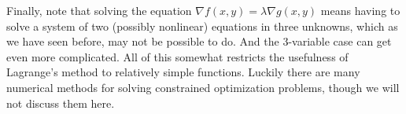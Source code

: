 Finally, note that solving the equation $\nabla f(x,y) = \lambda \nabla g(x,y)$ means having to solve a system of two (possibly nonlinear) equations in three unknowns, which as we have seen before, may not be possible to do. And the 3-variable case can get even more complicated. All of this somewhat restricts the usefulness of Lagrange's method to relatively simple functions. Luckily there are many numerical methods for solving constrained optimization problems, though we will not discuss them here.

